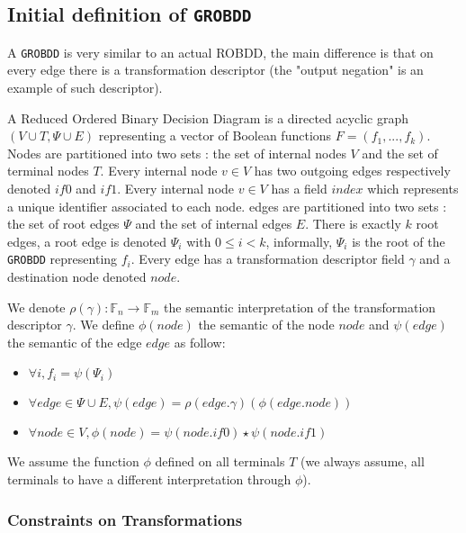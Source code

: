 \documentclass[a4paper,10pt]{article}
\newcommand{\F}{\mathbb{F}}
\newcommand{\GroBdd}{\texttt{GROBDD}}
\begin{document}
\subsection{Initial definition of \GroBdd{}}

A \GroBdd{} is very similar to an actual ROBDD, the main difference is that on every edge there is a transformation  descriptor (the "output negation" is an example of such descriptor).

A Reduced Ordered Binary Decision Diagram is a directed acyclic graph $(V\cup T, \Psi \cup E)$ representing a vector of Boolean functions $F=(f_1, ..., f_k)$.
Nodes are partitioned into two sets : the set of internal nodes $V$ and the set of terminal nodes $T$.
Every internal node $v\in V$ has two outgoing edges respectively denoted $\mathit{if0}$ and $\mathit{if1}$.
Every internal node $v\in V$ has a field $\mathit{index}$ which represents a unique identifier associated to each node.
edges are partitioned into two sets : the set of root edges $\Psi$ and the set of internal edges $E$.
There is exactly $k$ root edges, a root edge is denoted $\Psi_i$ with $0\leq i < k$, informally, $\Psi_i$ is the root of the \GroBdd{} representing $f_i$.
Every edge has a transformation descriptor field $\gamma$ and a destination node denoted $\mathit{node}$.

We denote $\rho(\gamma) : \F_n \longrightarrow \F_m$ the semantic interpretation of the transformation descriptor $\gamma$.
We define $\phi(node)$ the semantic of the node $node$ and $\psi(edge)$ the semantic of the edge $edge$ as follow:\begin{itemize}
\item $\forall i, f_i = \psi(\Psi_i)$
\item $\forall edge \in \Psi \cup E, \psi(edge) = \rho(edge.\gamma)(\phi(edge.\mathit{node}))$
\item $\forall node \in V, \phi(node) = \psi(node.\mathit{if0}) \star \psi(node.\mathit{if1})$
\end{itemize}
We assume the function $\phi$ defined on all terminals $T$ (we always assume, all terminals to have a different interpretation through $\phi$).

\subsubsection{Constraints on Transformations}
\end{document}
